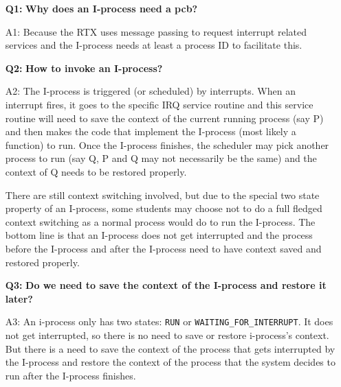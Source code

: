 \begin{itemize}
\item[{\bf Q1:}]{\bf Why does an I-process need a pcb?}
\item[A1:]
Because the RTX uses message passing to request interrupt related services and the I-process needs at least a process ID to facilitate this.

\item[\bf Q2:] {\bf How to invoke an I-process?}
\item[A2:] 
The I-process is triggered (or scheduled) by interrupts. When an interrupt fires, it goes to the specific IRQ service routine and this service routine will need to save the context of the current running process (say P) and then makes the code that implement the I-process (most likely a function) to run. Once the I-process finishes, the scheduler may pick another process to run (say Q, P and Q may not necessarily be the same) and the context of Q needs to be restored properly.

There are still context switching involved, but due to the special two state property of an I-process, some students may choose not to do a full fledged context switching as a normal process would do to run the I-process. The bottom line is that an I-process does not get interrupted and the process before the I-process and after the I-process need to have context saved and restored properly.

\item[{\bf Q3:}] {\bf Do we need to save the context of the I-process and restore it later?}
\item[A3:]  
An i-process only has two states: \verb+RUN+ or \verb+WAITING_FOR_INTERRUPT+. It does not get interrupted, so there is no need to save or restore i-process's context. But there is a need to save the context of the process that gets interrupted by the I-process and restore the context of the process that the system decides to run after the I-process finishes.


\end{itemize}
